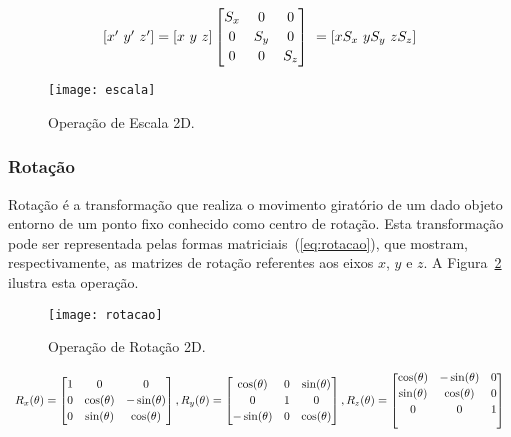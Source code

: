 \begin{equation}\label{eq:escala}
	\begin{array}{c c c}
	[x' \ y' \ z'] = [x \ y \ z]
	\begin{bmatrix}
	S_x & 0 & 0   \\[0.2em]
	0 & S_y & 0   \\[0.2em]
	0 & 0 & S_z
	\end{bmatrix}
	\
	= [xS_x\ yS_y\ zS_z]
	\end{array}
\end{equation}

\begin{figure}[ht!]
	\centering
	\texttt{[image: escala]}
	\caption{Operação de Escala 2D.}
	\label{fg:escala}
\end{figure} 

\subsubsection{Rotação}
	Rotação é a transformação que realiza o movimento giratório de um dado objeto entorno de um ponto fixo conhecido como centro de rotação. Esta transformação pode ser representada pelas formas matriciais~(\ref{eq:rotacao}), que mostram, respectivamente, as matrizes de rotação referentes aos eixos $x$, $y$ e $z$. A Figura~\ref{fg:rotacao} ilustra esta operação.

\begin{figure}[!ht]
	\centering
	\texttt{[image: rotacao]}
	\caption{Operação de Rotação 2D.}
	\label{fg:rotacao}
\end{figure} 
\begin{center}
\begin{equation}\label{eq:rotacao}
	\begin{array}{c c c}
	R_x(\theta) = \begin{bmatrix}
	1 & 0 & 0   \\[0.2em]
	0 & \cos(\theta) & -\sin(\theta)    \\[0.2em]
	0 & \sin(\theta) & \cos(\theta) \\
	\end{bmatrix}
	, 
	R_y(\theta) = \begin{bmatrix}
	\cos(\theta) & 0 & \sin(\theta) \\[0.2em]
	0 & 1 & 0   \\[0.2em]
	-\sin(\theta) & 0 & \cos(\theta)\\
	\end{bmatrix}
	,
	R_z(\theta) = \begin{bmatrix}
	\cos(\theta) & -\sin(\theta) & 0\\[0.2em]
	\sin(\theta) & \cos(\theta) & 0\\[0.2em]
	0 & 0 & 1\\\ 
	\end{bmatrix}
	\end{array}
\end{equation}
\end{center}

